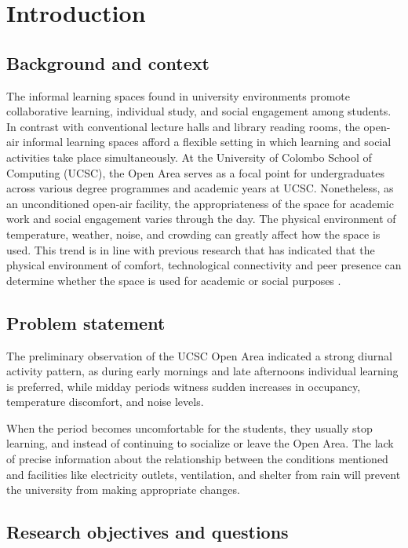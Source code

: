 \documentclass[12pt, a4paper]{report}
\begin{document}
\chapter{Introduction}

\section{Background and context}
The informal learning spaces found in university environments promote collaborative learning, individual study, and social engagement among students. In contrast with conventional lecture halls and library reading rooms, the open-air informal learning spaces afford a flexible setting in which learning and social activities take place simultaneously. At the University of Colombo School of Computing (UCSC), the Open Area serves as a focal point for undergraduates across various degree programmes and academic years at UCSC.
Nonetheless, as an unconditioned open-air facility, the appropriateness of the space for academic work and social engagement varies through the day. The physical environment of temperature, weather, noise, and crowding can greatly affect how the space is used. This trend is in line with previous research that has indicated that the physical environment of comfort, technological connectivity and peer presence can determine whether the space is used for academic or social purposes \citep{harrop2013}.

\section{Problem statement}
The preliminary observation of the UCSC Open Area indicated a strong diurnal activity pattern, as during early mornings and late afternoons individual learning is preferred, while midday periods witness sudden increases in occupancy, temperature discomfort, and noise levels.

When the period becomes uncomfortable for the students, they usually stop learning, and instead of continuing to socialize or leave the Open Area. The lack of precise information about the relationship between the conditions mentioned and facilities like electricity outlets, ventilation, and shelter from rain will prevent the university from making appropriate changes.
\newpage

\section{Research objectives and questions}
\end{document}
